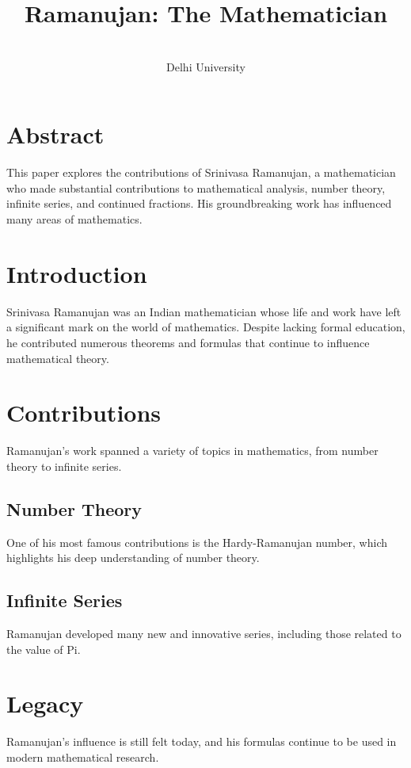 \documentclass[a4paper,10pt]{article}
\begin{document}
\title{Ramanujan: The Mathematician}
\author{\\ Delhi University}
\date{}
\maketitle



\tableofcontents
\vspace{10pt}

\section*{Abstract}
This paper explores the contributions of Srinivasa Ramanujan, a mathematician who made substantial contributions to mathematical analysis, number theory, infinite series, and continued fractions. His groundbreaking work has influenced many areas of mathematics.


\section{Introduction}
Srinivasa Ramanujan was an Indian mathematician whose life and work have left a significant mark on the world of mathematics. Despite lacking formal education, he contributed numerous theorems and formulas that continue to influence mathematical theory.

\section{Contributions}
Ramanujan's work spanned a variety of topics in mathematics, from number theory to infinite series.

\subsection{Number Theory}
One of his most famous contributions is the Hardy-Ramanujan number, which highlights his deep understanding of number theory.

\subsection{Infinite Series}
Ramanujan developed many new and innovative series, including those related to the value of Pi.

\section{Legacy}
Ramanujan's influence is still felt today, and his formulas continue to be used in modern mathematical research.
\end{document}

